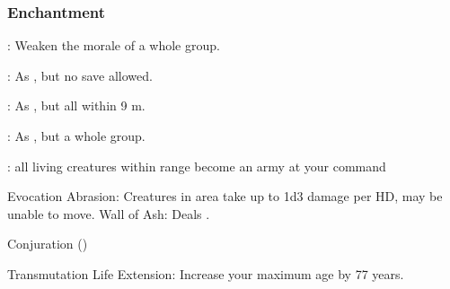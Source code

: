 \subsubsection{Enchantment}
: Weaken the morale of a whole group.

: As , but no save allowed.

: As , but all within 9 m.

: As , but a whole group.

: all living creatures within range become an army at your command


Evocation
Abrasion: Creatures in area take up to 1d3 damage per HD, may be unable to move.
Wall of Ash: Deals .

Conjuration ()

Transmutation
Life Extension: Increase your maximum age by 77 years.

